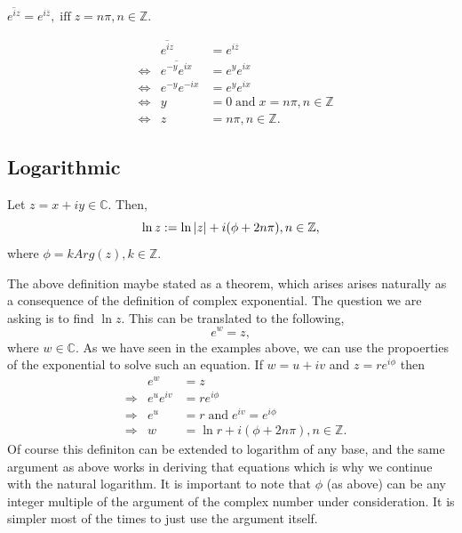 \documentclass[12pt]{book}
\begin{document}
\begin{exmp}
    $\overline{e^{iz}} = e^{i\overline{z}},\; \text{iff}\; z = n\pi, n \in \mathbb{Z}.$
\end{exmp}
\begin{align*}
    &&\overline{e^{iz}} 
        &= 
            e^{i\overline{z}} \\
    &\iff &\overline{e^{-y}e^{ix}}
        &=
            e^{y}e^{ix} \\
    &\iff &e^{-y}e^{-ix}
        &=
            e^{y}e^{ix} \\
    &\iff &y
        &=
            0\;
    \text{and}\;
    x
        =
            n\pi, n \in \mathbb{Z} \\
    &\iff &z
        &= 
            n\pi, n \in \mathbb{Z}.    
\end{align*}

\subsection{Logarithmic}
\begin{defn}
    Let $z = x + iy \in \mathbb{C}.$ Then,
    \[
        \ln z := \ln \left\lvert z \right\rvert + i (\phi + 2n\pi), n \in \mathbb{Z},
    \]
    where $\phi = k Arg(z), k \in \mathbb{Z}.$ 
\end{defn}
The above definition maybe stated as a theorem, which arises arises naturally as a consequence of the definition of complex exponential. The question we are asking is to find $\ln z.$ This can be translated to the following, 
\[
    e^{w} = z,
\]
where $w \in \mathbb{C}.$ As we have seen in the examples above, we can use the propoerties of the exponential to solve such an equation.
If $w = u + iv$ and $z = re^{i\phi}$ then 
\begin{align*}
    &&e^{w} 
        &= 
            z \\
    &\Rightarrow &e^{u}e^{iv}
        &=
            re^{i\phi} \\
    &\Rightarrow &e^{u}
        &=
            r\;
    \text{and}\;
    e^{iv}
        =
            e^{i\phi} \\
    &\Rightarrow &w 
        &= 
            \ln r + i(\phi + 2n\pi), n \in \mathbb{Z}.
\end{align*}
Of course this definiton can be extended to logarithm of any base, and the same argument as above works in deriving that equations which is why we continue with the natural logarithm. It is important to note that $\phi$ (as above) can be any integer multiple of the argument of the complex number under consideration. It is simpler most of the times to just use the argument itself. 
\end{document}

